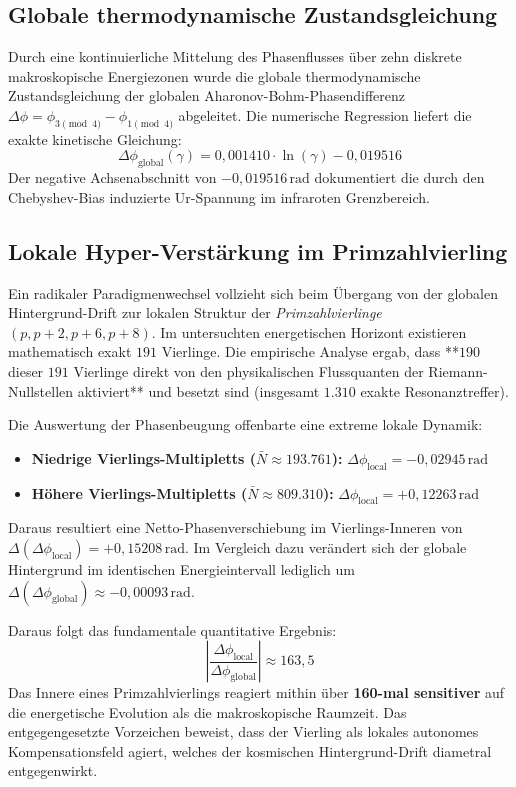 \documentclass[11pt,a4paper]{article}
\begin{document}
\subsection{Globale thermodynamische Zustandsgleichung}
Durch eine kontinuierliche Mittelung des Phasenflusses über zehn diskrete makroskopische Energiezonen wurde die globale thermodynamische Zustandsgleichung der globalen Aharonov-Bohm-Phasendifferenz $\Delta\phi = \phi_{3\pmod 4} - \phi_{1\pmod 4}$ abgeleitet. Die numerische Regression liefert die exakte kinetische Gleichung:
\begin{equation}
\Delta\phi_{\text{global}}(\gamma) = 0,001410 \cdot \ln(\gamma) - 0,019516
\end{equation}
Der negative Achsenabschnitt von $-0,019516\,\text{rad}$ dokumentiert die durch den Chebyshev-Bias induzierte Ur-Spannung im infraroten Grenzbereich.

\subsection{Lokale Hyper-Verstärkung im Primzahlvierling}
Ein radikaler Paradigmenwechsel vollzieht sich beim Übergang von der globalen Hintergrund-Drift zur lokalen Struktur der \textit{Primzahlvierlinge} $(p, p+2, p+6, p+8)$. Im untersuchten energetischen Horizont existieren mathematisch exakt $191$ Vierlinge.
Die empirische Analyse ergab, dass **$190$ dieser $191$ Vierlinge direkt von den physikalischen Flussquanten der Riemann-Nullstellen aktiviert** und besetzt sind (insgesamt $1.310$ exakte Resonanztreffer).

Die Auswertung der Phasenbeugung offenbarte eine extreme lokale Dynamik:
\begin{itemize}
    \item \textbf{Niedrige Vierlings-Multipletts ($\bar{N} \approx 193.761$):} $\Delta\phi_{\text{local}} = -0,02945\,\text{rad}$
    \item \textbf{Höhere Vierlings-Multipletts ($\bar{N} \approx 809.310$):} $\Delta\phi_{\text{local}} = +0,12263\,\text{rad}$
\end{itemize}
Daraus resultiert eine Netto-Phasenverschiebung im Vierlings-Inneren von $\Delta(\Delta\phi_{\text{local}}) = +0,15208\,\text{rad}$. Im Vergleich dazu verändert sich der globale Hintergrund im identischen Energieintervall lediglich um $\Delta(\Delta\phi_{\text{global}}) \approx -0,00093\,\text{rad}$. 

Daraus folgt das fundamentale quantitative Ergebnis:
\begin{equation}
\left| \frac{\Delta\phi_{\text{local}}}{\Delta\phi_{\text{global}}} \right| \approx 163,5
\end{equation}
Das Innere eines Primzahlvierlings reagiert mithin über \textbf{160-mal sensitiver} auf die energetische Evolution als die makroskopische Raumzeit. Das entgegengesetzte Vorzeichen beweist, dass der Vierling als lokales autonomes Kompensationsfeld agiert, welches der kosmischen Hintergrund-Drift diametral entgegenwirkt.
\end{document}
